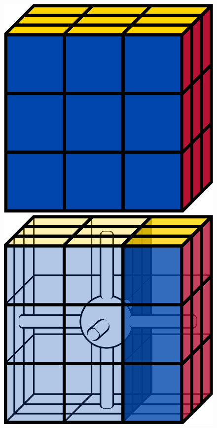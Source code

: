 \documentclass[12pt]{article}
\begin{document}
\begin{figure}[h]
    \centering
    \begin{minipage}[c]{0.2\textwidth}
        \includegraphics[scale=0.1]{cube.png}
    \end{minipage}
    \begin{minipage}[c]{0.2\textwidth}
        \includegraphics[scale=0.1]{moves/core_r_highlight.png}

\end{minipage}
\end{figure}
\end{document}
